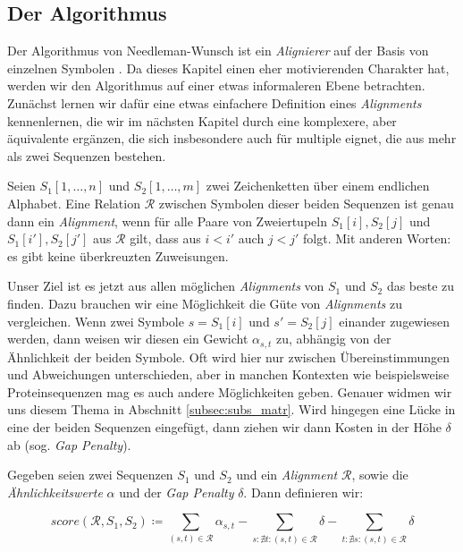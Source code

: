 \subsection{Der Algorithmus}

Der Algorithmus von Needleman-Wunsch ist ein \emph{Alignierer} auf der Basis von einzelnen Symbolen \citep{nw70}. Da dieses Kapitel einen eher motivierenden Charakter hat, werden wir den Algorithmus auf einer etwas informaleren Ebene betrachten. Zunächst lernen wir dafür eine etwas einfachere Definition eines \emph{Alignments} kennenlernen, die wir im nächsten Kapitel durch eine komplexere, aber äquivalente ergänzen, die sich insbesondere auch für multiple eignet, die aus mehr als zwei Sequenzen bestehen.

\begin{definition}
	Seien $S_1[1,\dots, n]$ und $S_2[1,\dots,m]$ zwei Zeichenketten über einem endlichen Alphabet. Eine Relation $\mathcal{R}$ zwischen Symbolen dieser beiden Sequenzen ist genau dann ein \emph{Alignment}, wenn für alle Paare von Zweiertupeln $S_1[i],S_2[j]$ und $S_1[i'],S_2[j']$ aus $\mathcal{R}$ gilt, dass aus $i < i'$ auch $j < j'$ folgt. Mit anderen Worten: es gibt keine überkreuzten Zuweisungen.
\end{definition}

Unser Ziel ist es jetzt aus allen möglichen \emph{Alignments} von $S_1$ und $S_2$ das beste zu finden. Dazu brauchen wir eine Möglichkeit die Güte von \emph{Alignments} zu vergleichen. Wenn zwei Symbole $s = S_1[i]$ und $s' = S_2[j]$ einander zugewiesen werden, dann weisen wir diesen ein Gewicht $\alpha_{s,t}$ zu, abhängig von der Ähnlichkeit der beiden Symbole. Oft wird hier nur zwischen Übereinstimmungen und Abweichungen unterschieden, aber in manchen Kontexten wie beispielsweise Proteinsequenzen mag es auch andere Möglichkeiten geben. Genauer widmen wir uns diesem Thema in Abschnitt \ref{subsec:subs_matr}. Wird hingegen eine Lücke in eine der beiden Sequenzen eingefügt, dann ziehen wir dann Kosten in der Höhe $\delta$ ab (sog. \emph{Gap Penalty}).

\begin{definition}
	Gegeben seien zwei Sequenzen $S_1$ und $S_2$ und ein \emph{Alignment} $\mathcal{R}$, sowie die \emph{Ähnlichkeitswerte} $\alpha$ und  der \emph{Gap Penalty} $\delta$. Dann definieren wir:
	
	\begin{equation}
		score(\mathcal{R},S_1,S_2) \coloneqq \sum_{(s,t)\in \mathcal{R}}{\alpha_{s,t}} - \sum_{s : \nexists t : (s,t)\in \mathcal{R}}{\delta} - \sum_{t : \nexists s : (s,t)\in \mathcal{R}}{\delta}
	\end{equation}
\end{definition}

